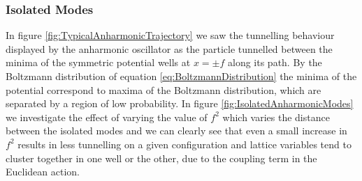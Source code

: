 \documentclass[12pt]{article}
\begin{document}
            \subsubsection{Isolated Modes}
                In figure \ref{fig:TypicalAnharmonicTrajectory} we saw the tunnelling behaviour displayed by the anharmonic oscillator as the particle tunnelled between the minima of the symmetric potential wells at $x=\pm f$ along its path. By the Boltzmann distribution of equation \ref{eq:BoltzmannDistribution} the minima of the potential correspond to maxima of the Boltzmann distribution, which are separated by a region of low probability. In figure \ref{fig:IsolatedAnharmonicModes} we investigate the effect of varying the value of $f^2$ which varies the distance between the isolated modes and we can clearly see that even a small increase in $f^2$ results in less tunnelling on a given configuration and lattice variables tend to cluster together in one well or the other, due to the coupling term in the Euclidean action.
\end{document}

